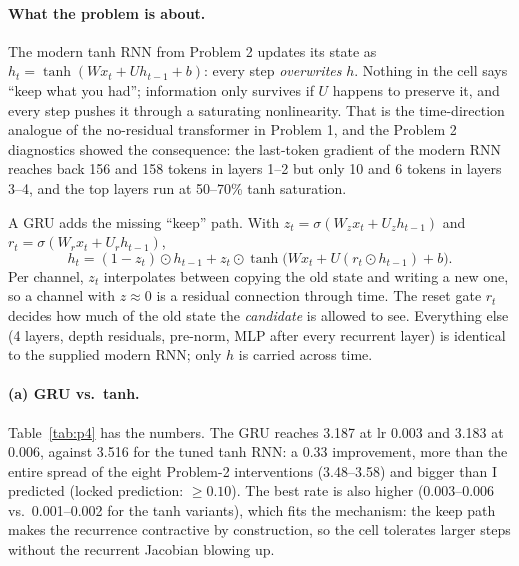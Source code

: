 \paragraph{What the problem is about.} The modern tanh RNN from Problem 2 updates its state as $h_t = \tanh(W x_t + U h_{t-1} + b)$: every step \emph{overwrites} $h$. Nothing in the cell says ``keep what you had''; information only survives if $U$ happens to preserve it, and every step pushes it through a saturating nonlinearity. That is the time-direction analogue of the no-residual transformer in Problem 1, and the Problem 2 diagnostics showed the consequence: the last-token gradient of the modern RNN reaches back 156 and 158 tokens in layers 1--2 but only 10 and 6 tokens in layers 3--4, and the top layers run at 50--70\% tanh saturation.

A GRU adds the missing ``keep'' path. With $z_t=\sigma(W_z x_t+U_z h_{t-1})$ and $r_t=\sigma(W_r x_t+U_r h_{t-1})$,
\[ h_t = (1-z_t)\odot h_{t-1} + z_t\odot \tanh\big(W x_t + U (r_t\odot h_{t-1}) + b\big). \]
Per channel, $z_t$ interpolates between copying the old state and writing a new one, so a channel with $z\approx 0$ is a residual connection through time. The reset gate $r_t$ decides how much of the old state the \emph{candidate} is allowed to see. Everything else (4 layers, depth residuals, pre-norm, MLP after every recurrent layer) is identical to the supplied modern RNN; only $h$ is carried across time.

\paragraph{(a) GRU vs.\ tanh.} Table~\ref{tab:p4} has the numbers. The GRU reaches 3.187 at lr 0.003 and 3.183 at 0.006, against 3.516 for the tuned tanh RNN: a 0.33 improvement, more than the entire spread of the eight Problem-2 interventions (3.48--3.58) and bigger than I predicted (locked prediction: $\geq 0.10$). The best rate is also higher (0.003--0.006 vs.\ 0.001--0.002 for the tanh variants), which fits the mechanism: the keep path makes the recurrence contractive by construction, so the cell tolerates larger steps without the recurrent Jacobian blowing up.



